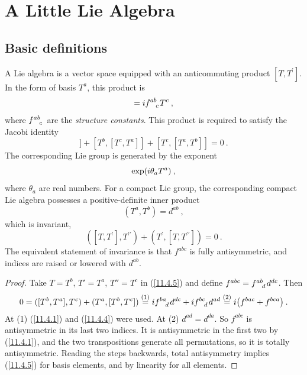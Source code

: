 \section{A Little Lie Algebra} \label{sec:11.4}

\subsection*{Basic definitions}

A Lie algebra is a vector space equipped with an anticommuting product $[T,T^{\prime}]$. In the form of basis $T^{a}$, this product is
\begin{equation}
	[T^{a},T^{b}] = \mi f\indices{^a^b_c}T^{c} \:, \label{11.4.1}
\end{equation}
where $f\indices{^a^b_c}$ are the \emph{structure constants}. This product is required to satisfy the Jacobi identity
\begin{equation}
	[T^{a},[T^{b},T^{c}]] + [T^{b},[T^{c},T^{a}]] + [T^{c},[T^{a},T^{b}]] =0 \:.\label{11.4.2}
\end{equation}
The corresponding Lie group is generated by the exponent
\begin{equation}
	\exp(i\theta_{a}T^{a}) \:, \label{11.4.3}
\end{equation}
where $\theta_{a}$ are real numbers. For a compact Lie group, the corresponding compact Lie algebra possesses a positive-definite inner product
\begin{equation}
	(T^{a},T^{b}) = d^{ab} \:, \label{11.4.4}
\end{equation}
which is invariant,
\begin{equation}
	([T,T^{\prime}],T^{\prime\prime}) + (T^{\prime},[T,T^{\prime\prime}]) =0\:. \label{11.4.5}
\end{equation}
The equivalent statement of invariance is that $f^{abc}$ is fully antisymmetric, and indices are raised or lowered with $d^{ab}$.
\begin{tcolorbox}[breakable]
	\begin{proof}
		Take $T=T^{b}$, $T'=T^{a}$, $T''=T^{c}$ in (\ref{11.4.5}) and define $f^{abc}=f\indices{^a^b_d}d^{dc}$. Then
		\begin{align*}
			0=([T^{b},T^{a}],T^{c})+(T^{a},[T^{b},T^{c}])
			\eqs{1}\mi f\indices{^b^a_d}d^{dc}+\mi f\indices{^b^c_d}d^{ad}
			\eqs{2}\mi\bigl(f^{bac}+f^{bca}\bigr)\:.
		\end{align*}
		At (1) (\ref{11.4.1}) and (\ref{11.4.4}) were used. At (2) $d^{ad}=d^{da}$. So $f^{abc}$ is antisymmetric in its last two indices. It is antisymmetric in the first two by (\ref{11.4.1}), and the two transpositions generate all permutations, so it is totally antisymmetric. Reading the steps backwards, total antisymmetry implies (\ref{11.4.5}) for basis elements, and by linearity for all elements.
	\end{proof}
\end{tcolorbox}

